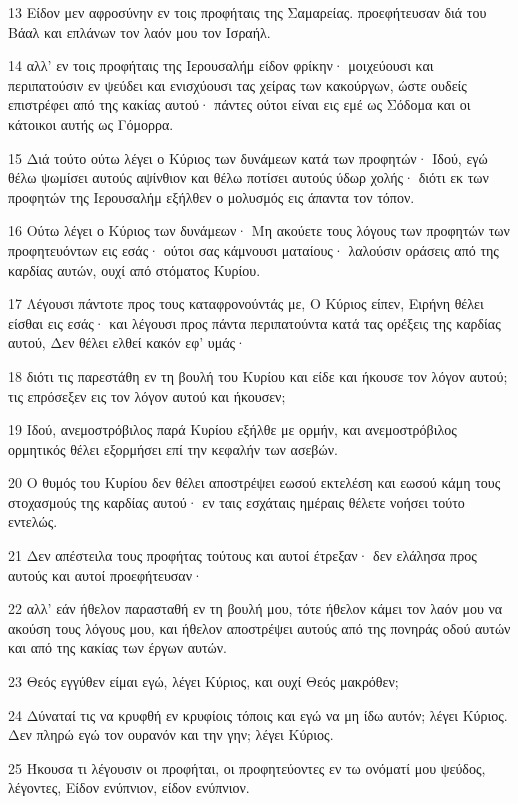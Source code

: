 \par 13 Είδον μεν αφροσύνην εν τοις προφήταις της Σαμαρείας. προεφήτευσαν διά του Βάαλ και επλάνων τον λαόν μου τον Ισραήλ.
\par 14 αλλ' εν τοις προφήταις της Ιερουσαλήμ είδον φρίκην· μοιχεύουσι και περιπατούσιν εν ψεύδει και ενισχύουσι τας χείρας των κακούργων, ώστε ουδείς επιστρέφει από της κακίας αυτού· πάντες ούτοι είναι εις εμέ ως Σόδομα και οι κάτοικοι αυτής ως Γόμορρα.
\par 15 Διά τούτο ούτω λέγει ο Κύριος των δυνάμεων κατά των προφητών· Ιδού, εγώ θέλω ψωμίσει αυτούς αψίνθιον και θέλω ποτίσει αυτούς ύδωρ χολής· διότι εκ των προφητών της Ιερουσαλήμ εξήλθεν ο μολυσμός εις άπαντα τον τόπον.
\par 16 Ούτω λέγει ο Κύριος των δυνάμεων· Μη ακούετε τους λόγους των προφητών των προφητευόντων εις εσάς· ούτοι σας κάμνουσι ματαίους· λαλούσιν οράσεις από της καρδίας αυτών, ουχί από στόματος Κυρίου.
\par 17 Λέγουσι πάντοτε προς τους καταφρονούντάς με, Ο Κύριος είπεν, Ειρήνη θέλει είσθαι εις εσάς· και λέγουσι προς πάντα περιπατούντα κατά τας ορέξεις της καρδίας αυτού, Δεν θέλει ελθεί κακόν εφ' υμάς·
\par 18 διότι τις παρεστάθη εν τη βουλή του Κυρίου και είδε και ήκουσε τον λόγον αυτού; τις επρόσεξεν εις τον λόγον αυτού και ήκουσεν;
\par 19 Ιδού, ανεμοστρόβιλος παρά Κυρίου εξήλθε με ορμήν, και ανεμοστρόβιλος ορμητικός θέλει εξορμήσει επί την κεφαλήν των ασεβών.
\par 20 Ο θυμός του Κυρίου δεν θέλει αποστρέψει εωσού εκτελέση και εωσού κάμη τους στοχασμούς της καρδίας αυτού· εν ταις εσχάταις ημέραις θέλετε νοήσει τούτο εντελώς.
\par 21 Δεν απέστειλα τους προφήτας τούτους και αυτοί έτρεξαν· δεν ελάλησα προς αυτούς και αυτοί προεφήτευσαν·
\par 22 αλλ' εάν ήθελον παρασταθή εν τη βουλή μου, τότε ήθελον κάμει τον λαόν μου να ακούση τους λόγους μου, και ήθελον αποστρέψει αυτούς από της πονηράς οδού αυτών και από της κακίας των έργων αυτών.
\par 23 Θεός εγγύθεν είμαι εγώ, λέγει Κύριος, και ουχί Θεός μακρόθεν;
\par 24 Δύναταί τις να κρυφθή εν κρυφίοις τόποις και εγώ να μη ίδω αυτόν; λέγει Κύριος. Δεν πληρώ εγώ τον ουρανόν και την γην; λέγει Κύριος.
\par 25 Ήκουσα τι λέγουσιν οι προφήται, οι προφητεύοντες εν τω ονόματί μου ψεύδος, λέγοντες, Είδον ενύπνιον, είδον ενύπνιον.
